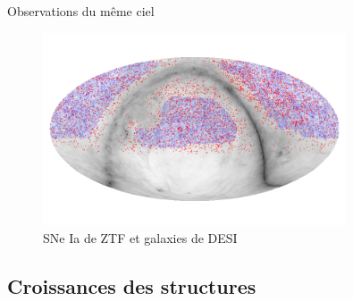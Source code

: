 \documentclass{beamer}
\begin{document}
\begin{frame}{Observations du même ciel}
\begin{figure}
	\centering
	\includegraphics[width=0.8\textwidth, trim={3mm 1cm 3mm 1cm}, clip]{figures/ztf_desi_on_dust.png}
	\caption{SNe Ia de ZTF et galaxies de DESI}
\end{figure}
\end{frame}

\subsection{Croissances des structures}

\end{document}
